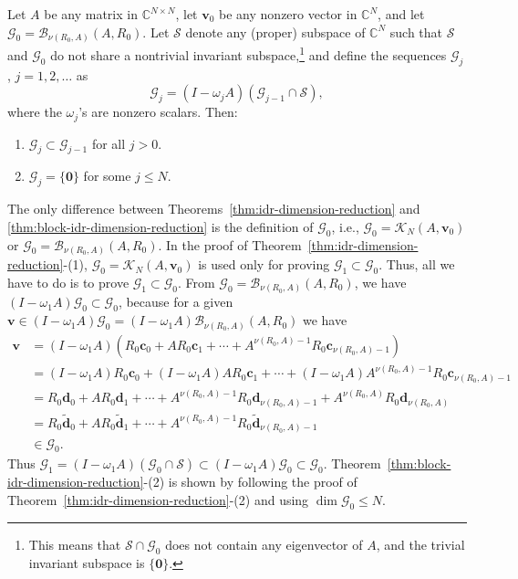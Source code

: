 \par{}
\begin{Theorem}\label{thm:block-idr-dimension-reduction}
{Let $A$ be any matrix in $\mathbb C^{N\times N}$, let $\bm v_0$ be any nonzero vector in $\mathbb C^N$, and let $\mathcal G_0=\mathcal B_{\nu(R_0,A)}(A,R_0)$. Let $\mathcal S$ denote any (proper) subspace of $\mathbb C^N$ such that $\mathcal S$ and $\mathcal G_0$ do not share a nontrivial invariant subspace,}\footnote{{This means that $\mathcal S\cap\mathcal G_0$ does not contain any eigenvector of $A$, and the trivial invariant subspace is $\{\bm0\}$.}}
{and define the sequences $\mathcal G_j$, $j=1,2,\ldots$ as}
\begin{equation}\label{eq:block-idr-subspace-recurrence}\mathcal G_j=(I-\omega_jA)(\mathcal G_{j-1}\cap\mathcal S),\end{equation}
{where the $\omega_j$'s are nonzero scalars. Then:}
\begin{enumerate}[label=(\arabic*)]
\item $\mathcal G_j\subset\mathcal G_{j-1}$ {for all $j>0$.}
\item $\mathcal G_j=\{\bm0\}$ {for some $j\le N$.}
\end{enumerate}\end{Theorem}
\begin{Proof}
{The only difference between Theorems\ \ref{thm:idr-dimension-reduction} and \ref{thm:block-idr-dimension-reduction} is the definition of $\mathcal G_0$, i.e., $\mathcal G_0=\mathcal K_N(A,\bm v_0)$ or $\mathcal G_0=\mathcal B_{\nu(R_0,A)}(A,R_0)$. In the proof of Theorem\ \ref{thm:idr-dimension-reduction}-(1), $\mathcal G_0=\mathcal K_N(A,\bm v_0)$ is used only for proving $\mathcal G_1\subset\mathcal G_0$. Thus, all we have to do is to prove $\mathcal G_1\subset\mathcal G_0$. From $\mathcal G_0=\mathcal B_{\nu(R_0,A)}(A,R_0)$, we have $(I-\omega_1A)\mathcal G_0\subset\mathcal G_0$, because for a given $\bm v\in(I-\omega_1A)\mathcal G_0=(I-\omega_1A)\mathcal B_{\nu(R_0,A)}(A,R_0)$ we have}
\[\begin{aligned}\bm v&=(I-\omega_1A)(R_0\bm c_0+AR_0\bm c_1+\cdots+A^{\nu(R_0,A)-1}R_0\bm c_{\nu(R_0,A)-1})\\&=(I-\omega_1A)R_0\bm c_0+(I-\omega_1A)AR_0\bm c_1+\cdots+(I-\omega_1A)A^{\nu(R_0,A)-1}R_0\bm c_{\nu(R_0,A)-1}\\&=R_0\bm d_0+AR_0\bm d_1+\cdots+A^{\nu(R_0,A)-1}R_0\bm d_{\nu(R_0,A)-1}+A^{\nu(R_0,A)}R_0\bm d_{\nu(R_0,A)}\\&=R_0\widetilde{\bm d}_0+AR_0\widetilde{\bm d}_1+\cdots+A^{\nu(R_0,A)-1}R_0\widetilde{\bm d}_{\nu(R_0,A)-1}\\&\in\mathcal G_0.\end{aligned}\]
{Thus $\mathcal G_1=(I-\omega_1A)(\mathcal G_0\cap\mathcal S)\subset(I-\omega_1A)\mathcal G_0\subset\mathcal G_0$.}
{Theorem\ \ref{thm:block-idr-dimension-reduction}-(2) is shown by following the proof of Theorem\ \ref{thm:idr-dimension-reduction}-(2) and using $\dim\mathcal G_0\le N$.}
\par\nopagebreak[4]
\end{Proof}
